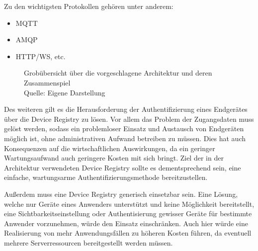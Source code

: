\pagebreak
Zu den wichtigsten Protokollen gehören unter anderem:
\begin{itemize}
    \item MQTT
    \item AMQP
    \item HTTP/WS, etc.
\end{itemize}

\begin{figure}
    \centering
    \caption{Grobübersicht über die vorgeschlagene Architektur und deren Zusammenspiel\\ Quelle: Eigene Darstellung}
    \label{fig:high_level}
\end{figure}

Des weiteren gilt es die Herausforderung der Authentifizierung eines Endgerätes über die Device Registry zu lösen. Vor allem das Problem der Zugangsdaten muss gelöst werden, sodass ein problemloser Einsatz und Austausch von Endgeräten möglich ist, ohne administrativen Aufwand betreiben zu müssen. Dies hat auch Konsequenzen auf die wirtschaftlichen Auswirkungen, da ein geringer Wartungsaufwand auch geringere Kosten mit sich bringt. Ziel der in der Architektur verwendeten Device Registry sollte es dementsprechend sein, eine einfache, wartungsarme Authentifizierungsmethode bereitzustellen.

Außerdem muss eine Device Registry generisch einsetzbar sein. Eine Lösung, welche nur Geräte eines Anwenders unterstützt und keine Möglichkeit bereitstellt, eine Sichtbarkeitseinstellung oder Authentisierung gewisser Geräte für bestimmte Anwender vorzunehmen, würde den Einsatz einschränken. Auch hier würde eine Realisierung von mehr Anwendungsfällen zu höheren Kosten führen, da eventuell mehrere Serverressourcen bereitgestellt werden müssen.

